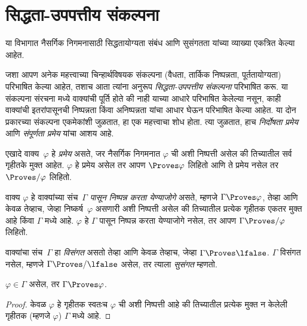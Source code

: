 \section{सिद्धता-उपपत्तीय संकल्पना}\label{fol:ntd:ptn:sec}
\begin{editorial}
या विभागात नैसर्गिक निगमनासाठी सिद्धतायोग्यता संबंध आणि सुसंगतता यांच्या
व्याख्या एकत्रित केल्या आहेत.
\end{editorial}
\begin{explain}
जशा आपण अनेक महत्त्वाच्या चिन्हार्थविषयक संकल्पना (वैधता, तार्किक निष्पन्नता,
पूर्ततायोग्यता) परिभाषित केल्या आहेत, तशाच आता त्यांना अनुरूप
\emph{सिद्धता-उपपत्तीय संकल्पना} परिभाषित करू. या संकल्पना संरचना मध्ये
वाक्यांची पूर्ति होते की नाही याच्या आधारे परिभाषित केलेल्या नसून,
काही वाक्यांची इतरांपासूनची निष्पन्नता किंवा
अनिष्पन्नता यांचा आधार घेऊन परिभाषित केल्या आहेत. या दोन प्रकारच्या
संकल्पना एकमेकांशी जुळतात, हा एक महत्त्वाचा शोध होता. त्या जुळतात, हाच
\emph{निर्दोषता प्रमेय} आणि \emph{संपूर्णता प्रमेय} यांचा आशय आहे.
\end{explain}
\begin{defn}[प्रमेये]
एखादे वाक्य~$\varphi$ हे \emph{प्रमेय} असते, जर नैसर्गिक निगमनात $\varphi$ ची
अशी निष्पत्ती असेल की तिच्यातील सर्व गृहीतके मुक्त आहेत.
$\varphi$ हे प्रमेय असेल तर आपण $\Proves \varphi$ लिहितो आणि ते प्रमेय नसेल तर
$\Proves/ \varphi$ लिहितो.
\end{defn}
\begin{defn}[निष्पन्नता]
वाक्य $\varphi$ हे वाक्यांच्या संच~$\Gamma$ \emph{पासून
निष्पन्न करता येण्याजोगे} असते, म्हणजे $\Gamma \Proves \varphi$, तेव्हा आणि केवळ तेव्हाच,
जेव्हा निष्कर्ष~$\varphi$ असणारी अशी निष्पत्ती असेल की तिच्यातील प्रत्येक
गृहीतक एकतर मुक्त आहे किंवा $\Gamma$ मध्ये आहे. $\varphi$ हे $\Gamma$
पासून निष्पन्न करता येण्याजोगे नसेल, तर आपण $\Gamma \Proves/ \varphi$ लिहितो.
\end{defn}
\begin{defn}[सुसंगतता]
वाक्यांचा संच~$\Gamma$ हा \emph{विसंगत} असतो तेव्हा आणि केवळ तेव्हाच,
जेव्हा $\Gamma \Proves \lfalse$. $\Gamma$ विसंगत नसेल, म्हणजे
$\Gamma \Proves/ \lfalse$ असेल, तर त्याला \emph{सुसंगत} म्हणतो.
\end{defn}
\begin{prop}[परावर्तिता]
\label{fol:ntd:ptn:prop:reflexivity}
$\varphi \in \Gamma$ असेल, तर $\Gamma \Proves \varphi$.
\end{prop}
\begin{proof}
केवळ $\varphi$ हे गृहीतक स्वतःच $\varphi$ ची अशी निष्पत्ती आहे की तिच्यातील
प्रत्येक मुक्त न केलेली गृहीतक (म्हणजे $\varphi$) $\Gamma$ मध्ये आहे.
\end{proof}
